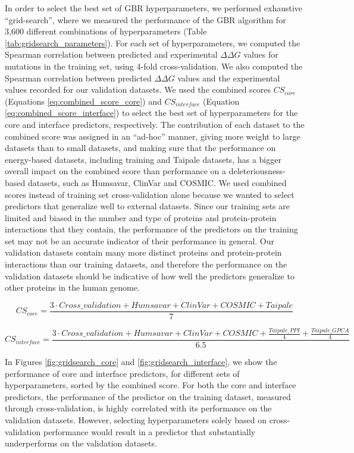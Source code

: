 In order to select the best set of GBR hyperparameters, we performed exhaustive ``grid-search'', where we measured the performance of the GBR algorithm for 3,600 different combinations of hyperparameters (Table \ref{tab:gridsearch_parameters}). For each set of hyperparameters, we computed the Spearman correlation between predicted and experimental $\Delta \Delta G$ values for mutations in the training set, using 4-fold cross-validation. We also computed the Spearman correlation between predicted $\Delta \Delta G$ values and the experimental values recorded for our validation datasets. We used the combined scores $CS_{core}$ (Equations \ref{eq:combined_score_core}) and $CS_{interface}$ (Equation \ref{eq:combined_score_interface}) to select the best set of hyperparameters for the core and interface predictors, respectively. The contribution of each dataset to the combined score was assigned in an ``ad-hoc'' manner, giving more weight to large datasets than to small datasets, and making sure that the performance on energy-based datasets, including training and Taipale datasets, has a bigger overall impact on the combined score than performance on a deleteriousness-based datasets, such as Humsavar, ClinVar and COSMIC. We used combined scores instead of training set cross-validation alone because we wanted to select predictors that generalize well to external datasets. Since our training sets are limited and biased in the number and type of proteins and protein-protein interactions that they contain, the performance of the predictors on the training set may not be an accurate indicator of their performance in general. Our validation datasets contain many more distinct proteins and protein-protein interactions than our training datasets, and therefore the performance on the validation datasets should be indicative of how well the predictors generalize to other proteins in the human genome.

\begin{equation} \label{eq:combined_score_core}
    CS_{core} = \frac{3 \cdot Cross\_validation + Humsavar + ClinVar + COSMIC + Taipale}{7}
\end{equation}

\begin{equation} \label{eq:combined_score_interface}
    CS_{interface} = \frac{3 \cdot Cross\_validation + Humsavar + ClinVar + COSMIC + \frac{Taipale\_{PPI}}{4} + \frac{Taipale\_{GPCA}}{4}}{6.5}
\end{equation}

In Figures \ref{fig:gridsearch_core} and \ref{fig:gridsearch_interface}, we show the performance of core and interface predictors, for different sets of hyperparameters, sorted by the combined score. For both the core and interface predictors, the performance of the predictor on the training dataset, measured through cross-validation, is highly correlated with its performance on the validation datasets. However, selecting hyperparameters solely based on cross-validation performance would result in a predictor that substantially underperforms on the validation datasets.

